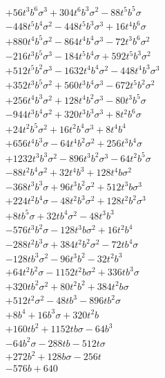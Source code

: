 {\begin{align*}
&+56t^{3}b^{6}\sigma^{3}+304t^{6}b^{3}\sigma^{2}-88t^{5}b^{5}\sigma\\
&-448t^{5}b^{4}\sigma^{2}-448t^{5}b^{3}\sigma^{3}+16t^{4}b^{6}\sigma\\
&+880t^{4}b^{5}\sigma^{2}-864t^{4}b^{4}\sigma^{3}-72t^{3}b^{6}\sigma^{2}\\
&-216t^{3}b^{5}\sigma^{3}-184t^{5}b^{4}\sigma+592t^{5}b^{3}\sigma^{2}\\
&+512t^{5}b^{2}\sigma^{3}-1632t^{4}b^{4}\sigma^{2}-448t^{4}b^{3}\sigma^{3}\\
&+352t^{3}b^{5}\sigma^{2}+560t^{3}b^{4}\sigma^{3}-672t^{5}b^{2}\sigma^{2}\\
&+256t^{4}b^{3}\sigma^{2}+128t^{4}b^{2}\sigma^{3}-80t^{3}b^{5}\sigma\\
&-944t^{3}b^{4}\sigma^{2}+320t^{3}b^{3}\sigma^{3}+8t^{2}b^{6}\sigma\\
&+24t^{2}b^{5}\sigma^{2}+16t^{2}b^{4}\sigma^{3}+8t^{4}b^{4}\\
&+656t^{4}b^{3}\sigma-64t^{4}b^{2}\sigma^{2}+256t^{3}b^{4}\sigma\\
&+1232t^{3}b^{3}\sigma^{2}-896t^{3}b^{2}\sigma^{3}-64t^{2}b^{5}\sigma\\
&-88t^{2}b^{4}\sigma^{2}+32t^{4}b^{3}+128t^{4}b\sigma^{2}\\
&-368t^{3}b^{3}\sigma+96t^{3}b^{2}\sigma^{2}+512t^{3}b\sigma^{3}\\
&+224t^{2}b^{4}\sigma-48t^{2}b^{3}\sigma^{2}+128t^{2}b^{2}\sigma^{3}\\
&+8tb^{5}\sigma+32tb^{4}\sigma^{2}-48t^{3}b^{3}\\
&-576t^{3}b^{2}\sigma-128t^{3}b\sigma^{2}+16t^{2}b^{4}\\
&-288t^{2}b^{3}\sigma+384t^{2}b^{2}\sigma^{2}-72tb^{4}\sigma\\
&-128tb^{3}\sigma^{2}-96t^{3}b^{2}-32t^{2}b^{3}\\
&+64t^{2}b^{2}\sigma-1152t^{2}b\sigma^{2}+336tb^{3}\sigma\\
&+320tb^{2}\sigma^{2}+80t^{2}b^{2}+384t^{2}b\sigma\\
&+512t^{2}\sigma^{2}-48tb^{3}-896tb^{2}\sigma\\
&+8b^{4}+16b^{3}\sigma+320t^{2}b\\
&+160tb^{2}+1152tb\sigma-64b^{3}\\
&-64b^{2}\sigma-288tb-512t\sigma\\
&+272b^{2}+128b\sigma-256t\\
&-576b+640
\end{align*}
}

